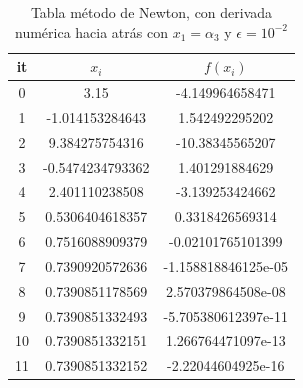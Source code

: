 \documentclass{article} %
\begin{document}
\begin{table}[H]
\centering
\begin{tabular}{|c|c|c|}
\hline
it & $x_i$ & $f(x_i)$\\
\hline
0 & 3.15 & -4.149964658471\\
1 & -1.014153284643 & 1.542492295202\\
2 & 9.384275754316 & -10.38345565207\\
3 & -0.5474234793362 & 1.401291884629\\
4 & 2.401110238508 & -3.139253424662\\
5 & 0.5306404618357 & 0.3318426569314\\
6 & 0.7516088909379 & -0.02101765101399\\
7 & 0.7390920572636 & -1.158818846125e-05\\
8 & 0.7390851178569 & 2.570379864508e-08\\
9 & 0.7390851332493 & -5.705380612397e-11\\
10 & 0.7390851332151 & 1.266764471097e-13\\
11 & 0.7390851332152 & -2.22044604925e-16\\
\hline
\end{tabular}
\caption{Tabla método de Newton, con derivada numérica hacia atrás con $x_1 = \alpha_3$ y $\epsilon = 10^{-2}$}
\end{table}
\end{document}
